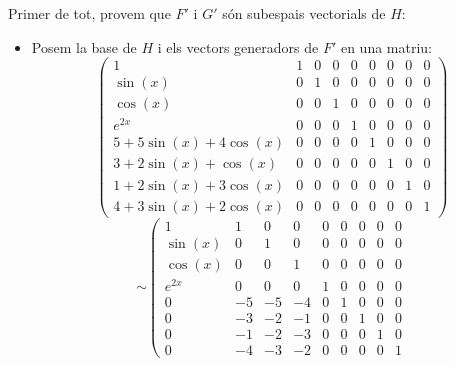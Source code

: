 \documentclass[a4paper, 12pt]{article}
\begin{document}
    \begin{solucio}
        Primer de tot, provem que $F'$ i $G'$ són subespais vectorials de $H$:
        \begin{itemize}
            \item Posem la base de $H$ i els vectors generadors de $F'$ en una matriu:
            \begin{displaymath}
                \left(
                    \begin{array}{c|cccccccc}
                        1 & 1 & 0 & 0 & 0 & 0 & 0 & 0 & 0\\
                        \sin(x) & 0 & 1 & 0 & 0 & 0 & 0 & 0 & 0\\
                        \cos(x) & 0 & 0 & 1 & 0 & 0 & 0 & 0 & 0\\
                        e^{2x} & 0 & 0 & 0 & 1 & 0 & 0 & 0 & 0\\
                        \hline
                        5+5\sin(x)+4\cos(x) & 0 & 0 & 0 & 0 & 1 & 0 & 0 & 0\\
                        3+2\sin(x)+\cos(x) & 0 & 0 & 0 & 0 & 0 & 1 & 0 & 0\\
                        1+2\sin(x)+3\cos(x) & 0 & 0 & 0 & 0 & 0 & 0 & 1 & 0\\
                        4+3\sin(x)+2\cos(x) & 0 & 0 & 0 & 0 & 0 & 0 & 0 & 1
                    \end{array}
                \right)
            \end{displaymath}
            \begin{displaymath}
                \sim
                \left(
                    \begin{array}{c|cccccccc}
                        1 & 1 & 0 & 0 & 0 & 0 & 0 & 0 & 0\\
                        \sin(x) & 0 & 1 & 0 & 0 & 0 & 0 & 0 & 0\\
                        \cos(x) & 0 & 0 & 1 & 0 & 0 & 0 & 0 & 0\\
                        e^{2x} & 0 & 0 & 0 & 1 & 0 & 0 & 0 & 0\\
                        \hline
                        0 & -5 & -5 & -4 & 0 & 1 & 0 & 0 & 0\\
                        0 & -3 & -2 & -1 & 0 & 0 & 1 & 0 & 0\\
                        0 & -1 & -2 & -3 & 0 & 0 & 0 & 1 & 0\\
                        0 & -4 & -3 & -2 & 0 & 0 & 0 & 0 & 1
                    \end{array}

\end{displaymath}
\end{itemize}
\end{solucio}
\end{document}
